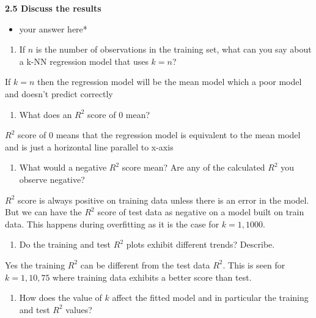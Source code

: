 \documentclass[11pt]{article}
\providecommand{\tightlist}{%
      \setlength{\itemsep}{0pt}\setlength{\parskip}{0pt}}
\begin{document}
    \textbf{2.5 Discuss the results}

    \begin{itemize}
\tightlist
\item
  your answer here*
\end{itemize}

\begin{enumerate}
\def\labelenumi{\arabic{enumi}.}
\tightlist
\item
  If \(n\) is the number of observations in the training set, what can
  you say about a k-NN regression model that uses \(k = n\)?
\end{enumerate}

If \(k = n\) then the regression model will be the mean model which a
poor model and doesn't predict correctly

\begin{enumerate}
\def\labelenumi{\arabic{enumi}.}
\setcounter{enumi}{1}
\tightlist
\item
  What does an \(R^2\) score of \(0\) mean?
\end{enumerate}

\(R^2\) score of \(0\) means that the regression model is equivalent to
the mean model and is just a horizontal line parallel to x-axis

\begin{enumerate}
\def\labelenumi{\arabic{enumi}.}
\setcounter{enumi}{2}
\tightlist
\item
  What would a negative \(R^2\) score mean? Are any of the calculated
  \(R^2\) you observe negative?
\end{enumerate}

\(R^2\) score is always positive on training data unless there is an
error in the model. But we can have the \(R^2\) score of test data as
negative on a model built on train data. This happens during overfitting
as it is the case for \(k=1,1000\).

\begin{enumerate}
\def\labelenumi{\arabic{enumi}.}
\setcounter{enumi}{3}
\tightlist
\item
  Do the training and test \(R^2\) plots exhibit different trends?
  Describe.
\end{enumerate}

Yes the training \(R^2\) can be different from the test data \(R^2\).
This is seen for \(k=1, 10, 75\) where training data exhibits a better
score than test.

\begin{enumerate}
\def\labelenumi{\arabic{enumi}.}
\setcounter{enumi}{4}
\tightlist
\item
  How does the value of \(k\) affect the fitted model and in particular
  the training and test \(R^2\) values?
\end{enumerate}
\end{document}
